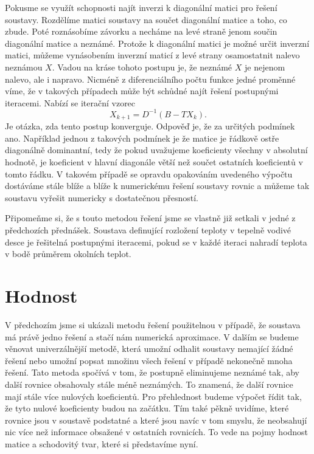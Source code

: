 \documentclass[12pt]{article}
\begin{document}
Pokusme se využít schopnosti najít inverzi k diagonální matici pro řešení soustavy. Rozdělíme matici soustavy na součet diagonální matice a toho, co zbude. Poté roznásobíme závorku a necháme na levé straně jenom součin diagonální matice a neznámé. Protože k diagonální matici je možné určit inverzní matici, můžeme vynásobením inverzní maticí z levé strany osamostatnit nalevo neznámou $X$. Vadou na kráse tohoto postupu je, že neznámé $X$ je nejenom nalevo, ale i napravo. Nicméně z diferenciálního počtu funkce jedné proměnné víme, že v takových případech může být schůdné najít řešení postupnými iteracemi. Nabízí se iterační vzorec $$X_{k+1}=D^{-1}(B-TX_k).$$ Je otázka, zda tento postup konverguje. Odpověď je, že za určitých podmínek ano. Například jednou z takových podmínek je že matice je řádkově ostře diagonálně dominantní, tedy že pokud uvažujeme koeficienty všechny v absolutní hodnotě, je koeficient v hlavní diagonále větší než součet ostatních koeficientů v tomto řádku. V takovém případě se opravdu opakováním uvedeného výpočtu dostáváme stále blíže a blíže k numerickému řešení soustavy rovnic a můžeme tak soustavu vyřešit numericky s dostatečnou přesností. 

Připomeňme si, že s touto metodou řešení jsme se vlastně již setkali v jedné z předchozích přednášek. Soustava definující rozložení teploty v tepelně vodivé desce je řešitelná postupnými iteracemi, pokud se v každé iteraci nahradí teplota v bodě průměrem okolních teplot.

\section{Hodnost}

V předchozím jsme si ukázali metodu řešení použitelnou v případě, že soustava má právě jedno řešení a stačí nám numerická aproximace. V dalším se budeme věnovat univerzálnější metodě, která umožní odhalit soustavy nemající žádné řešení nebo umožní popsat množinu všech řešení v případě nekonečně mnoha řešení. Tato metoda spočívá v tom, že postupně eliminujeme neznámé tak, aby další rovnice obsahovaly stále méně neznámých. To znamená, že další rovnice mají stále více nulových koeficientů. Pro přehlednost budeme výpočet řídit tak, že tyto nulové koeficienty budou na začátku. Tím také pěkně uvidíme, které rovnice jsou v soustavě podstatné a které jsou navíc v tom smyslu, že neobsahují nic více než informace obsažené v ostatních rovnicích. To vede na pojmy hodnost matice a schodovitý tvar, které si představíme nyní. 
\end{document}

